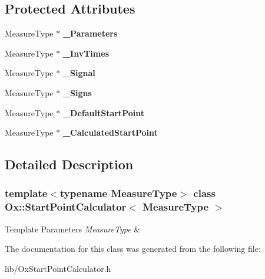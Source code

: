 \subsection*{Protected Attributes}
\begin{DoxyCompactItemize}
\item 
\mbox{\label{class_ox_1_1_start_point_calculator_ad721df33ec372ade730fb94055e64db3}} 
Measure\+Type $\ast$ {\bfseries \+\_\+\+Parameters}
\item 
\mbox{\label{class_ox_1_1_start_point_calculator_af164f2798ff050ddb8f702982a0e73b3}} 
Measure\+Type $\ast$ {\bfseries \+\_\+\+Inv\+Times}
\item 
\mbox{\label{class_ox_1_1_start_point_calculator_a923acf15f31702b37a833fa6e800b810}} 
Measure\+Type $\ast$ {\bfseries \+\_\+\+Signal}
\item 
\mbox{\label{class_ox_1_1_start_point_calculator_a36ae6d07f7e71ab8fdc38fa4c5ce4d72}} 
Measure\+Type $\ast$ {\bfseries \+\_\+\+Signs}
\item 
\mbox{\label{class_ox_1_1_start_point_calculator_a46ac58c2865e173224057602373487ce}} 
Measure\+Type $\ast$ {\bfseries \+\_\+\+Default\+Start\+Point}
\item 
\mbox{\label{class_ox_1_1_start_point_calculator_a90c26143db22a371533de08a87cdada0}} 
Measure\+Type $\ast$ {\bfseries \+\_\+\+Calculated\+Start\+Point}
\end{DoxyCompactItemize}


\subsection{Detailed Description}
\subsubsection*{template$<$typename Measure\+Type$>$\newline
class Ox\+::\+Start\+Point\+Calculator$<$ Measure\+Type $>$}


\begin{DoxyTemplParams}{Template Parameters}
{\em Measure\+Type} & \\
\hline
\end{DoxyTemplParams}


The documentation for this class was generated from the following file\+:\begin{DoxyCompactItemize}
\item 
lib/Ox\+Start\+Point\+Calculator.\+h\end{DoxyCompactItemize}
